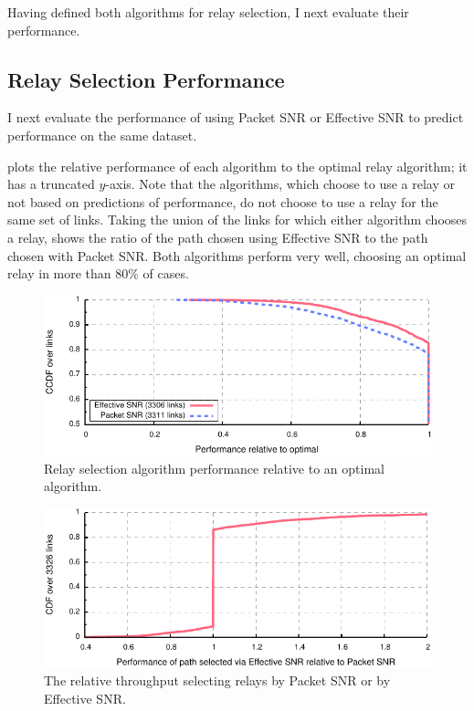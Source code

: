 Having defined both algorithms for relay selection, I next evaluate their performance.

\subsection{Relay Selection Performance}
I next evaluate the performance of  using Packet SNR or Effective SNR to predict performance on the same dataset.

 plots the relative performance of each algorithm to the optimal relay algorithm; it has a truncated $y$-axis. Note that the algorithms, which choose to use a relay or not based on predictions of performance, do not choose to use a relay for the same set of links. Taking the union of the links for which either algorithm chooses a relay,  shows the ratio of the path chosen using Effective SNR to the path chosen with Packet SNR. Both algorithms perform very well, choosing an optimal relay in more than 80\% of cases.

\begin{figure}[t]
	\centering
	\includegraphics[width=\textwidth]{figures/applications/relay_ratio_opt.pdf}
	\caption[Relay selection algorithm performance relative to an optimal algorithm]{\label{fig:relay_ratio_opt}Relay selection algorithm performance relative to an optimal algorithm.}
\end{figure}
\begin{figure}[t]
	\centering
	\includegraphics[width=\textwidth]{figures/applications/relay_ratio.pdf}
	\caption[The relative throughput selecting relays by Packet SNR or by Effective SNR]{\label{fig:relay_ratio}The relative throughput selecting relays by Packet SNR or by Effective SNR.}
\end{figure}

